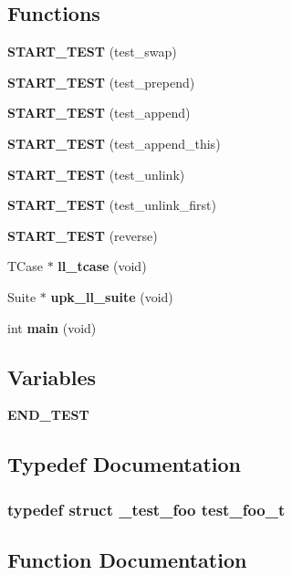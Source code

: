 \subsection*{Functions}
\begin{DoxyCompactItemize}
\item 
{\bf START\_\-TEST} (test\_\-swap)
\item 
{\bf START\_\-TEST} (test\_\-prepend)
\item 
{\bf START\_\-TEST} (test\_\-append)
\item 
{\bf START\_\-TEST} (test\_\-append\_\-this)
\item 
{\bf START\_\-TEST} (test\_\-unlink)
\item 
{\bf START\_\-TEST} (test\_\-unlink\_\-first)
\item 
{\bf START\_\-TEST} (reverse)
\item 
TCase $\ast$ {\bf ll\_\-tcase} (void)
\item 
Suite $\ast$ {\bf upk\_\-ll\_\-suite} (void)
\item 
int {\bf main} (void)
\end{DoxyCompactItemize}
\subsection*{Variables}
\begin{DoxyCompactItemize}
\item 
{\bf END\_\-TEST}
\end{DoxyCompactItemize}


\subsection{Typedef Documentation}
\subsubsection[{test\_\-foo\_\-t}]{\setlength{\rightskip}{0pt plus 5cm}typedef struct {\bf \_\-test\_\-foo} {\bf test\_\-foo\_\-t}}\label{dlinked__lists_8c_a4b43c8ae206659538de9a05feb083943}


\subsection{Function Documentation}
